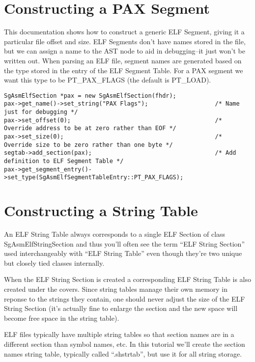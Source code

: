 \section{Constructing a PAX Segment}

This documentation shows how to construct a generic ELF Segment,
giving it a particular file offset and size. ELF Segments don't have
names stored in the file, but we can assign a name to the AST node to
aid in debugging--it just won't be written out. When parsing an ELF
file, segment names are generated based on the type stored in the
entry of the ELF Segment Table. For a PAX segment we want this type to
be PT\_PAX\_FLAGS (the default is PT\_LOAD).

\begin{verbatim}
SgAsmElfSection *pax = new SgAsmElfSection(fhdr);
pax->get_name()->set_string("PAX Flags");                   /* Name just for debugging */
pax->set_offset(0);                                         /* Override address to be at zero rather than EOF */
pax->set_size(0);                                           /* Override size to be zero rather than one byte */
segtab->add_section(pax);                                   /* Add definition to ELF Segment Table */
pax->get_segment_entry()->set_type(SgAsmElfSegmentTableEntry::PT_PAX_FLAGS);
\end{verbatim}

\section{Constructing a String Table}

An ELF String Table always corresponds to a single ELF Section of
class SgAsmElfStringSection and thus you'll often see the term ``ELF
String Section'' used interchangeably with ``ELF String Table'' even
though they're two unique but closely tied classes internally.

When the ELF String Section is created a corresponding ELF String
Table is also created under the covers. Since string tables manage
their own memory in reponse to the strings they contain, one should
never adjust the size of the ELF String Section (it's actually fine to
enlarge the section and the new space will become free space in the
string table).

ELF files typically have multiple string tables so that section names
are in a different section than symbol names, etc. In this tutorial
we'll create the section names string table, typically called
``.shstrtab'', but use it for all string storage.

